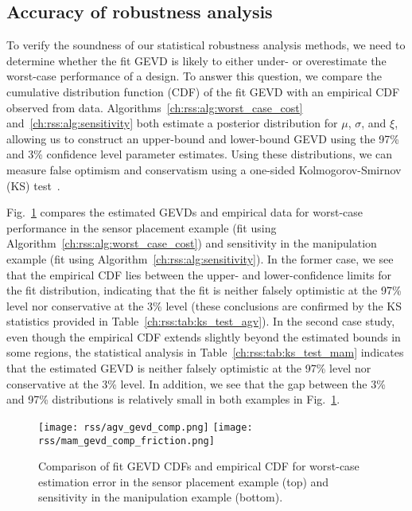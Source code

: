 \subsection{Accuracy of robustness analysis}\label{ch:rss:soundness}

To verify the soundness of our statistical robustness analysis methods, we need to determine whether the fit GEVD is likely to either under- or overestimate the worst-case performance of a design. To answer this question, we compare the cumulative distribution function (CDF) of the fit GEVD with an empirical CDF observed from data. Algorithms~\ref{ch:rss:alg:worst_case_cost} and~\ref{ch:rss:alg:sensitivity} both estimate a posterior distribution for $\mu$, $\sigma$, and $\xi$, allowing us to construct an upper-bound and lower-bound GEVD using the 97\% and 3\% confidence level parameter estimates. Using these distributions, we can measure false optimism and conservatism using a one-sided Kolmogorov-Smirnov (KS) test~\cite{nist_ks}.

Fig.~\ref{ch:rss:fig:ks_test} compares the estimated GEVDs and empirical data for worst-case performance in the sensor placement example (fit using Algorithm~\ref{ch:rss:alg:worst_case_cost}) and sensitivity in the manipulation example (fit using Algorithm~\ref{ch:rss:alg:sensitivity}). In the former case, we see that the empirical CDF lies between the upper- and lower-confidence limits for the fit distribution, indicating that the fit is neither falsely optimistic at the 97\% level nor conservative at the 3\% level (these conclusions are confirmed by the KS statistics provided in Table~\ref{ch:rss:tab:ks_test_agv}). In the second case study, even though the empirical CDF extends slightly beyond the estimated bounds in some regions, the statistical analysis in Table~\ref{ch:rss:tab:ks_test_mam} indicates that the estimated GEVD is neither falsely optimistic at the 97\% level nor conservative at the 3\% level. In addition, we see that the gap between the 3\% and 97\% distributions is relatively small in both examples in Fig.~\ref{ch:rss:fig:ks_test}.

\begin{figure}[tb]
	\centering
	\texttt{[image: rss/agv\_gevd\_comp.png]}
	\texttt{[image: rss/mam\_gevd\_comp\_friction.png]}
	\caption{Comparison of fit GEVD CDFs and empirical CDF for worst-case estimation error in the sensor placement example (top) and sensitivity in the manipulation example (bottom).}
	\label{ch:rss:fig:ks_test}
\end{figure}


